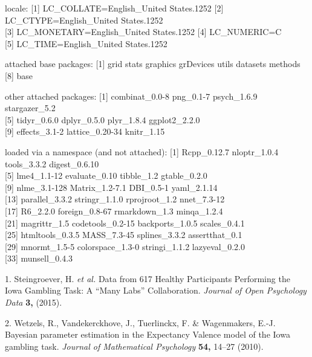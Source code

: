 \documentclass[,]{article}
\begin{document}
locale: {[}1{]} LC\_COLLATE=English\_United States.1252 {[}2{]}
LC\_CTYPE=English\_United States.1252\\
{[}3{]} LC\_MONETARY=English\_United States.1252 {[}4{]} LC\_NUMERIC=C\\
{[}5{]} LC\_TIME=English\_United States.1252

attached base packages: {[}1{]} grid stats graphics grDevices utils
datasets methods\\
{[}8{]} base

other attached packages: {[}1{]} combinat\_0.0-8 png\_0.1-7 psych\_1.6.9
stargazer\_5.2\\
{[}5{]} tidyr\_0.6.0 dplyr\_0.5.0 plyr\_1.8.4 ggplot2\_2.2.0\\
{[}9{]} effects\_3.1-2 lattice\_0.20-34 knitr\_1.15

loaded via a namespace (and not attached): {[}1{]} Rcpp\_0.12.7
nloptr\_1.0.4 tools\_3.3.2 digest\_0.6.10\\
{[}5{]} lme4\_1.1-12 evaluate\_0.10 tibble\_1.2 gtable\_0.2.0\\
{[}9{]} nlme\_3.1-128 Matrix\_1.2-7.1 DBI\_0.5-1 yaml\_2.1.14\\
{[}13{]} parallel\_3.3.2 stringr\_1.1.0 rprojroot\_1.2 nnet\_7.3-12\\
{[}17{]} R6\_2.2.0 foreign\_0.8-67 rmarkdown\_1.3 minqa\_1.2.4\\
{[}21{]} magrittr\_1.5 codetools\_0.2-15 backports\_1.0.5
scales\_0.4.1\\
{[}25{]} htmltools\_0.3.5 MASS\_7.3-45 splines\_3.3.2 assertthat\_0.1\\
{[}29{]} mnormt\_1.5-5 colorspace\_1.3-0 stringi\_1.1.2
lazyeval\_0.2.0\\
{[}33{]} munsell\_0.4.3

\hypertarget{refs}{}
\hypertarget{ref-steingroever_data_2015}{}
1. Steingroever, H. \emph{et al.} Data from 617 Healthy Participants
Performing the Iowa Gambling Task: A ``Many Labs'' Collaboration.
\emph{Journal of Open Psychology Data} \textbf{3,} (2015).

\hypertarget{ref-wetzels_bayesian_2010}{}
2. Wetzels, R., Vandekerckhove, J., Tuerlinckx, F. \& Wagenmakers, E.-J.
Bayesian parameter estimation in the Expectancy Valence model of the
Iowa gambling task. \emph{Journal of Mathematical Psychology}
\textbf{54,} 14--27 (2010).
\end{document}

